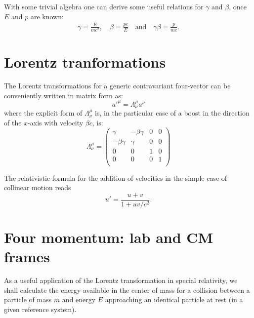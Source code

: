 With some trivial algebra one can derive some useful relations for $\gamma$ and
$\beta$, once $E$ and $p$ are known:
\begin{align*}
  \gamma = \frac{E}{mc^2}, \quad
  \beta = \frac{pc}{E} \quad\text{and}\quad
  \gamma\beta = \frac{p}{mc}.
\end{align*}


\section{Lorentz tranformations}

The Lorentz transformations for a generic contravariant four-vector can
be conveniently written in matrix form as:
\begin{equation}
{a'}^\mu = \Lambda^\mu_\nu a^\nu
\end{equation}
where the explicit form of $\Lambda^\mu_\nu$ is, in the particular case of
a boost in the direction of the $x$-axis with velocity $\beta c$, is:
\begin{equation}
  \Lambda^\mu_\nu =
  \begin{pmatrix}
    \gamma & -\beta\gamma & 0 & 0\\
    -\beta\gamma & \gamma & 0 & 0\\
    0 & 0 & 1 & 0\\
    0 & 0 & 0 & 1\\
  \end{pmatrix}
\end{equation}

The relativistic formula for the addition of velocities in the simple case of
collinear motion reads
\begin{equation}
u' = \frac{u + v}{1 + uv/c^2}.
\end{equation}


\section{Four momentum: lab and CM frames}

As a useful application of the Lorentz transformation in special relativity, we
shall calculate the energy available in the center of mass for a collision
between a particle of mass $m$ and energy $E$ approaching an identical particle
at rest (in a given reference system).

